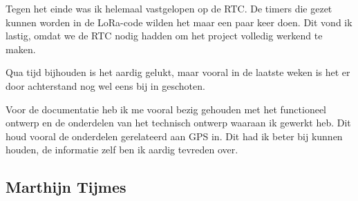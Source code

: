 Tegen het einde was ik helemaal vastgelopen op de RTC. De timers
die gezet kunnen worden in de LoRa-code wilden het maar een paar keer doen. Dit
vond ik lastig, omdat we de RTC nodig hadden om het project volledig werkend te
maken.

Qua tijd bijhouden is het aardig gelukt, maar vooral in de laatste weken is het
er door achterstand nog wel eens bij in geschoten.

Voor de documentatie heb ik me vooral bezig gehouden met het functioneel ontwerp
en de onderdelen van het technisch ontwerp waaraan ik gewerkt heb. Dit houd
vooral de onderdelen gerelateerd aan GPS in. Dit had ik beter bij kunnen houden,
de informatie zelf ben ik aardig tevreden over.

\subsection{Marthijn Tijmes}
